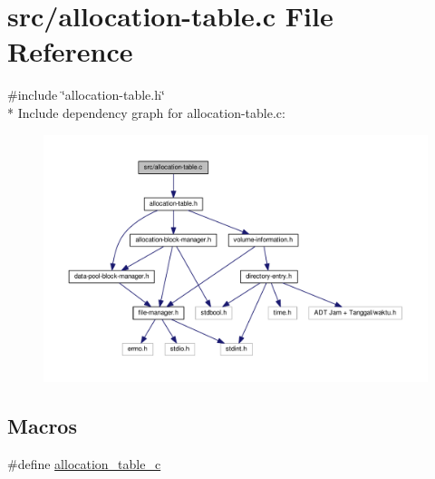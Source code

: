 \hypertarget{allocation-table_8c}{\section{src/allocation-\/table.c File Reference}
\label{allocation-table_8c}
}
{\ttfamily \#include \char`\"{}allocation-\/table.\-h\char`\"{}}\\*
Include dependency graph for allocation-\/table.c\-:
\nopagebreak
\begin{figure}[H]
\begin{center}
\leavevmode
\includegraphics[width=350pt]{allocation-table_8c__incl}
\end{center}
\end{figure}
\subsection*{Macros}
\begin{DoxyCompactItemize}
\item 
\#define \hyperlink{allocation-table_8c_afc5318de31f175f755f75812b44051c6}{allocation\-\_\-table\-\_\-c}
\end{DoxyCompactItemize}
